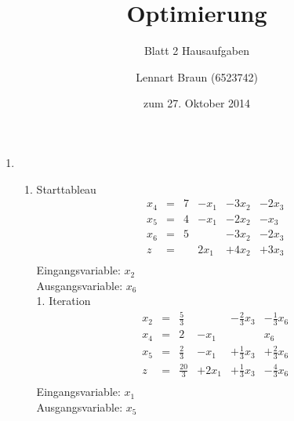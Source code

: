 \documentclass[a4paper]{scrartcl}
\title{Optimierung}
\subtitle{Blatt 2 Hausaufgaben}
\author{
	Lennart Braun (6523742) \\
}
\date{zum 27. Oktober 2014}
\begin{document}
\maketitle

\begin{enumerate}
    \item %
                \begin{enumerate}
                    \item
                        Starttableau
                        \begin{equation}
                            \begin{array}{rcrrrr}
                                x_4 & = & 7 & -x_1 & -3x_2 & -2x_3 \\
                                x_5 & = & 4 & -x_1 & -2x_2 &  -x_3 \\
                                x_6 & = & 5 &      & -3x_2 & -2x_3 \\
                                \hline
                                z   & = &   & 2x_1 & +4x_2 & +3x_3 \\
                            \end{array}
                        \end{equation}
                        Eingangsvariable: $x_2$ \\
                        Ausgangsvariable: $x_6$ \\

                        1. Iteration
                        \begin{equation}
                            \begin{array}{rcrrrr}
                                x_2 & = & \frac{5}{3} & & -\frac{2}{3}x_3 & -\frac{1}{3}x_6 \\
                                x_4 & = & 2 & -x_1 & & x_6 \\
                                x_5 & = & \frac{2}{3} & -x_1 & +\frac{1}{3}x_3 & +\frac{2}{3}x_6 \\
                                \hline
                                z   & = & \frac{20}{3} & +2x_1 & +\frac{1}{3}x_3 & -\frac{4}{3}x_6 \\
                            \end{array}
                        \end{equation}
                        Eingangsvariable: $x_1$ \\
                        Ausgangsvariable: $x_5$


\end{enumerate}
\end{enumerate}
\end{document}
